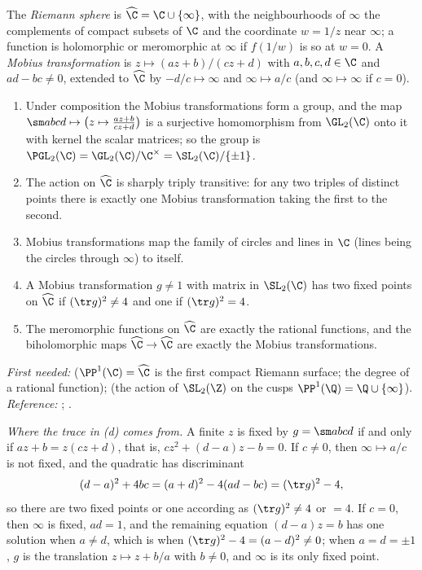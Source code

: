 \begin{definition}\label{def:prereq:mobius}
The \emph{Riemann sphere} is $\widehat\C=\C\cup\{\infty\}$, with the neighbourhoods of $\infty$
the complements of compact subsets of $\C$ and the coordinate $w=1/z$ near $\infty$; a function is
holomorphic or meromorphic at $\infty$ if $f(1/w)$ is so at $w=0$. A \emph{Mobius transformation}
is $z\mapsto(az+b)/(cz+d)$ with $a,b,c,d\in\C$ and $ad-bc\ne0$, extended to $\widehat\C$ by
$-d/c\mapsto\infty$ and $\infty\mapsto a/c$ (and $\infty\mapsto\infty$ if $c=0$).
\end{definition}

\begin{theorem}\label{thm:prereq:mobius}
\begin{enumerate}[label=(\alph*)]
\item Under composition the Mobius transformations form a group, and the map
$\sm abcd\mapsto\bigl(z\mapsto\frac{az+b}{cz+d}\bigr)$ is a surjective homomorphism from
$\GL_2(\C)$ onto it with kernel the scalar matrices; so the group is
$\PGL_2(\C)=\GL_2(\C)/\C^\times=\SL_2(\C)/\{\pm1\}$.
\item The action on $\widehat\C$ is sharply triply transitive: for any two triples of distinct
points there is exactly one Mobius transformation taking the first to the second.
\item Mobius transformations map the family of circles and lines in $\C$ (lines being the circles
through $\infty$) to itself.
\item A Mobius transformation $g\ne1$ with matrix in $\SL_2(\C)$ has two fixed points on
$\widehat\C$ if $(\tr g)^2\ne4$ and one if $(\tr g)^2=4$.
\item The meromorphic functions on $\widehat\C$ are exactly the rational functions, and the
biholomorphic maps $\widehat\C\to\widehat\C$ are exactly the Mobius transformations.
\end{enumerate}
\end{theorem}
\noindent\emph{First needed:}  ($\PP^1(\C)=\widehat\C$ is the first compact Riemann
surface; the degree of a rational function);  (the action of $\SL_2(\Z)$ on the
cusps $\PP^1(\Q)=\Q\cup\{\infty\}$). \emph{Reference:} \cite[Chapter 3, Section 3]{Ahlfors79};
\cite[Chapter 8]{SteinShakarchi03}.

\emph{Where the trace in (d) comes from.} A finite $z$ is fixed by $g=\sm abcd$ if and only if
$az+b=z(cz+d)$, that is, $cz^2+(d-a)z-b=0$. If $c\ne0$, then $\infty\mapsto a/c$ is not fixed, and
the quadratic has discriminant
\[
(d-a)^2+4bc=(a+d)^2-4(ad-bc)=(\tr g)^2-4,
\]
so there are two fixed points or one according as $(\tr g)^2\ne4$ or $=4$. If $c=0$, then $\infty$ is
fixed, $ad=1$, and the remaining equation $(d-a)z=b$ has one solution when $a\ne d$, which is when
$(\tr g)^2-4=(a-d)^2\ne0$; when $a=d=\pm1$, $g$ is the translation $z\mapsto z+b/a$ with $b\ne0$, and
$\infty$ is its only fixed point.

